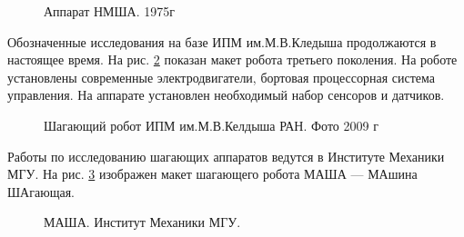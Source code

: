 \begin{figure}[ht]
	\begin{minipage}[ht]{0.49\linewidth}
	\end{minipage}
	\hfill
	\begin{minipage}[ht]{0.49\linewidth}
	\end{minipage}
	\caption{Аппарат НМША. 1975г}
	\label{img:NMSHA}  
\end{figure}

Обозначенные исследования на базе ИПМ им.М.В.Кледыша продолжаются в настоящее время. На рис. \ref{img:IPM_now} показан макет робота третьего поколения. На роботе установлены современные электродвигатели, бортовая процессорная система управления. На аппарате установлен необходимый набор сенсоров и датчиков.

\begin{figure}[ht]
	\begin{minipage}[ht]{0.49\linewidth}
	\end{minipage}
	\hfill
	\begin{minipage}[ht]{0.49\linewidth}
	\end{minipage}
	\caption{Шагающий робот ИПМ им.М.В.Келдыша РАН. Фото 2009 г}
	\label{img:IPM_now}  
\end{figure}

Работы по исследованию шагающих аппаратов ведутся в Институте Механики МГУ. На рис. \ref{img:masha} изображен макет шагающего робота МАША --- МАшина ШАгающая.

\begin{figure}[ht]
	\begin{minipage}[ht]{0.49\linewidth}
	\end{minipage}
	\hfill
	\begin{minipage}[ht]{0.49\linewidth}
	\end{minipage}
	\caption{МАША. Институт Механики МГУ.}
	\label{img:masha}  
\end{figure}

